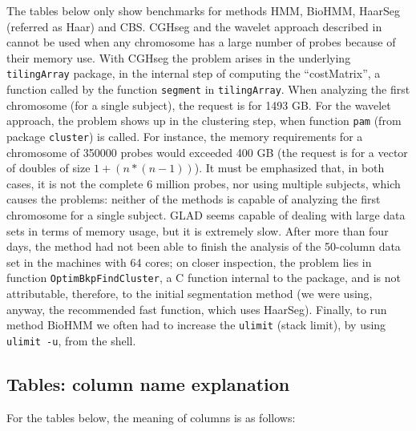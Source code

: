 \documentclass[a4paper,11pt]{article}
\begin{document}
The tables below only show benchmarks for methods HMM, BioHMM, HaarSeg
(referred as Haar) and CBS. CGHseg and the wavelet approach described in
\cite{waves-hsu} cannot be used when any chromosome has a large number of
probes because of their memory use. With CGHseg the problem arises in the
underlying \texttt{tilingArray} package, in the internal step of computing
the ``costMatrix'', a function called by the function \texttt{segment} in
\texttt{tilingArray}.  When analyzing the first chromosome (for a single
subject), the request is for 1493 GB.  For the wavelet approach, the
problem shows up in the clustering step, when function \texttt{pam} (from
package \texttt{cluster}) is called. For instance, the memory requirements
for a chromosome of 350000 probes would exceeded 400 GB (the request is
for a vector of doubles of size $1 + (n * (n - 1))$).  It must be
emphasized that, in both cases, it is not the complete 6 million probes,
nor using multiple subjects, which causes the problems: neither of the
methods is capable of analyzing the first chromosome for a single subject.
GLAD seems capable of dealing with large data sets in terms of memory
usage, but it is extremely slow. After more than four days, the method had
not been able to finish the analysis of the 50-column data set in the
machines with 64 cores; on closer inspection, the problem lies in function
\texttt{OptimBkpFindCluster}, a C function internal to the package, and is
not attributable, therefore, to the initial segmentation method (we were
using, anyway, the recommended fast function, which uses HaarSeg).
Finally, to run method BioHMM we often had to increase the \texttt{ulimit}
(stack limit), by using \texttt{ulimit -u}, from the shell.



\subsection{Tables: column name explanation}
For the tables below, the meaning of columns is as follows:
\end{document}
